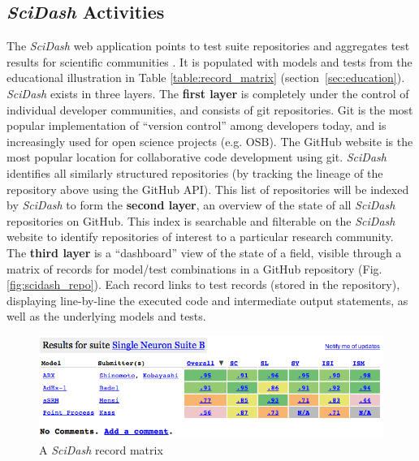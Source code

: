 \documentclass[11pt,letterpaper]{article}
\begin{document}
\subsection{\textit{SciDash} Activities}\label{sec:scidash_activities}
The \textit{SciDash} web application points to test suite repositories and aggregates test results for scientific communities \cite{scidash_url}. 
It is populated with models and tests from the educational illustration in Table \ref{table:record_matrix} (section~\ref{sec:education}). 
\textit{SciDash} exists in three layers.
The \textbf{first layer} is completely under the control of individual developer communities, and consists of git repositories. 
Git is the most popular implementation of ``version control'' among developers today\cite{ram_git_2013}, and is increasingly used for open science projects (e.g. OSB\cite{osb_url}). 
The GitHub website\cite{github_url} is the most popular location for collaborative code development using git. 
\textit{SciDash} identifies all similarly structured repositories (by tracking the lineage of the repository above using the GitHub API).
This list of repositories will be indexed by \textit{SciDash} to form the \textbf{second layer}, an overview of the state of all \textit{SciDash} repositories on GitHub.  
This index is searchable and filterable on the \textit{SciDash} website to identify repositories of interest to a particular research community.  
The \textbf{third layer} is a ``dashboard'' view of the state of a field, visible through a matrix of records for model/test combinations in a GitHub repository (Fig. \ref{fig:scidash_repo}). 
Each record links to test records (stored in the repository), displaying line-by-line the executed code and intermediate output statements, as well as the underlying models and tests.   

\begin{figure}%
\includegraphics[scale=0.65]{table.png}
\caption{A \textit{SciDash} record matrix}
\label{fig:scidash_matrix}
\vspace{-15px}
\end{figure}
\vspace{-10px}
\leavevmode
\end{document}
